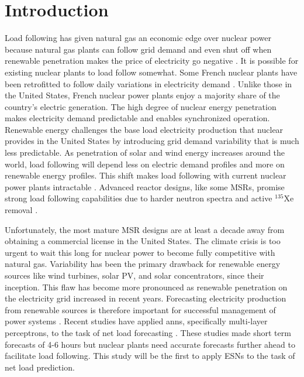 \section{Introduction}

Load following has given natural gas an economic edge over nuclear power
because natural gas plants can follow grid demand and even shut off when
renewable penetration makes the
price of electricity go negative \cite{keppler_carbon_2011}. It is possible for
existing nuclear plants to load follow somewhat. Some French nuclear
plants have been retrofitted to follow daily
variations in electricity demand \cite{lokhov_technical_2011}. Unlike those in
the United States, French nuclear power plants enjoy a majority share of the
country's electric generation. The high degree of nuclear energy penetration
makes electricity demand predictable and enables synchronized operation.
Renewable energy challenges the base load electricity production that
nuclear provides in the United States by introducing grid demand variability
that is much less predictable. As penetration of solar
and wind energy increases around the world, load following will depend less on
electric demand profiles and more on renewable energy profiles. This shift makes
load following with current nuclear power plants intractable \cite{cany_nuclear_2018}.
Advanced reactor designs, like some \glspl{MSR}, promise strong load following
capabilities due to harder
neutron spectra and active $^{135}$Xe removal \cite{rykhlevskii_impact_2019}.

Unfortunately, the most mature MSR
designs are at least a decade away from obtaining a commercial license in the
United States. The climate crisis is too urgent to wait this long for nuclear
power to become fully competitive with natural gas.
Variability has been the primary drawback for renewable energy sources like
wind turbines, solar PV, and solar concentrators, since their inception. This
flaw has become more pronounced as renewable penetration on the electricity
grid increased in recent years. Forecasting electricity production from
renewable sources is therefore important for successful management of power
systems \cite{kobylinski_high-resolution_2020}. Recent studies have applied
\glspl{ann}, specifically multi-layer perceptrons, to the task of net load
forecasting \cite{kobylinski_high-resolution_2020,dutta_load_2017,lee_development_2016}.
These studies made short term forecasts of 4-6 hours but nuclear plants
need accurate forecasts further ahead to facilitate load following.
This study will be the first to apply \glspl{ESN} to the task of net load
prediction.

